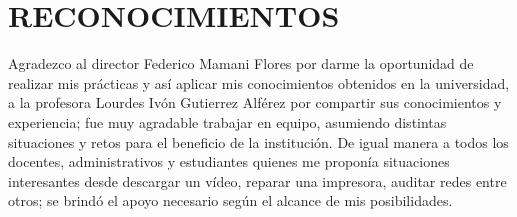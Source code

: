 \chapter*{RECONOCIMIENTOS}
\thispagestyle{empty}

Agradezco al director Federico Mamani Flores por darme la oportunidad de realizar mis prácticas y así aplicar mis conocimientos obtenidos en la universidad, a la profesora Lourdes Ivón Gutierrez Alférez por compartir sus conocimientos y experiencia; fue muy agradable trabajar en equipo, asumiendo distintas situaciones y retos para el beneficio de la institución. De igual manera a todos los docentes, administrativos y estudiantes quienes me proponía situaciones interesantes desde descargar un vídeo, reparar una impresora, auditar redes entre otros; se brindó el apoyo necesario según el alcance de mis posibilidades.
